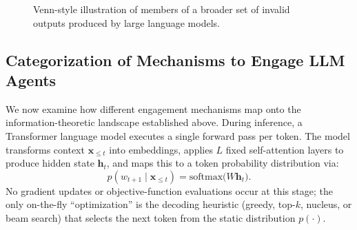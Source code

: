 \documentclass[12pt]{article}
\theoremstyle{definition}
\begin{document}
\usetikzlibrary{positioning}

\begin{figure}[t]
  \centering
  \caption{Venn-style illustration of members of a broader set of invalid outputs produced by large language models.}
  \label{fig:taxonomy}
\end{figure}

\subsection{Categorization of Mechanisms to Engage LLM Agents}
\label{sec:efficient-engagement}
We now examine how different engagement mechanisms map onto the information-theoretic landscape established above. During inference, a Transformer language model executes a single forward pass per token. The model transforms context $\mathbf{x}_{\le t}$ into embeddings, applies $L$ fixed self-attention layers to produce hidden state $\mathbf{h}_t$, and maps this to a token probability distribution via:
\[
p(w_{t+1}\mid\mathbf{x}_{\le t}) = \mathrm{softmax} \bigl(W\mathbf{h}_t\bigr).
\]
No gradient updates or objective-function evaluations occur at this stage; the only on-the-fly ``optimization'' is the decoding heuristic (greedy, top-$k$, nucleus, or beam search) that selects the next token from the static distribution $p(\cdot)$.
\end{document}
